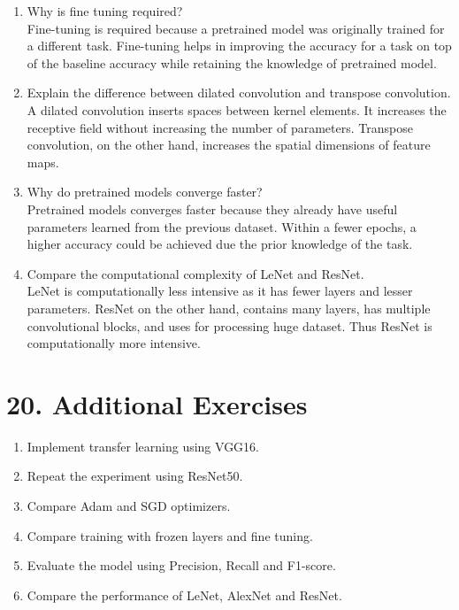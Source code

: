\documentclass[11pt]{article}
\begin{document}
\begin{enumerate}
\item Why is fine tuning required?\\
Fine-tuning is required because a pretrained model was originally trained for a different task. Fine-tuning helps in improving the accuracy for a task on top of the baseline accuracy while retaining the knowledge of pretrained model.

\item Explain the difference between dilated convolution and transpose convolution.\\
A dilated convolution inserts spaces between kernel elements. It increases the receptive field without increasing the number of parameters. Transpose convolution, on the other hand, increases the spatial dimensions of feature maps.

\item Why do pretrained models converge faster?\\
Pretrained models converges faster because they already have useful parameters learned from the previous dataset. Within a fewer epochs, a higher accuracy could be achieved due the prior knowledge of the task.

\item Compare the computational complexity of LeNet and ResNet.\\
LeNet is computationally less intensive as it has fewer layers and lesser parameters. ResNet on the other hand, contains many layers, has multiple convolutional blocks, and uses for processing huge dataset. Thus ResNet is computationally more intensive.
\end{enumerate}


\section*{20. Additional Exercises}

\begin{enumerate}

\item Implement transfer learning using VGG16.

\item Repeat the experiment using ResNet50.

\item Compare Adam and SGD optimizers.

\item Compare training with frozen layers and fine tuning.

\item Evaluate the model using Precision, Recall and F1-score.

\item Compare the performance of LeNet, AlexNet and ResNet.

\end{enumerate}
\end{document}
